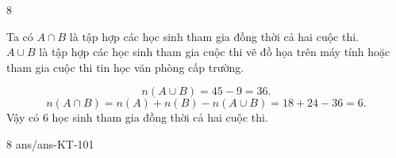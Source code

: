 \begin{indapan}{8}
\begin{bt}
{{Ta có $A \cap B$ là tập hợp các học sinh tham gia đồng thời cả hai cuộc thi.\\
 $A \cup B$ là tập hợp các học sinh tham gia cuộc thi vẽ đồ họa trên máy tính hoặc tham gia  cuộc thi tin học văn phòng cấp trường. 
}{
}
$$n \left(A \cup B \right)= 45-9=36.$$	
$$n \left( A \cap B \right) = n(A)+ n(B)-n(A \cup B)=18+24-36= 6.$$
Vậy có $6$  học sinh tham gia đồng thời cả hai cuộc thi.
	}
\end{bt}

\begin{indapan}{8}
{ans/ans-KT-101}
\end{indapan}
\newpage




\end{indapan}
